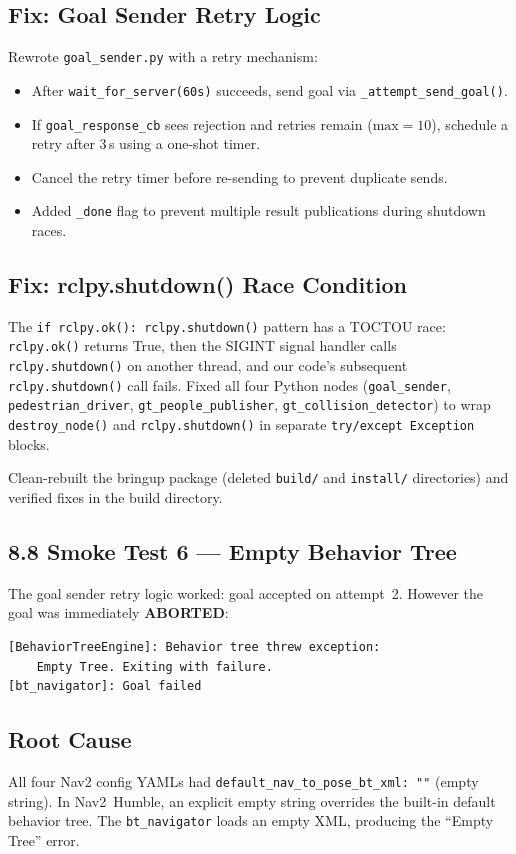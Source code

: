\documentclass[11pt]{article}
\newcommand{\logentry}[1]{\subsection*{#1}}
\begin{document}
\logentry{Fix: Goal Sender Retry Logic}
Rewrote \texttt{goal\_sender.py} with a retry mechanism:
\begin{itemize}
  \item After \texttt{wait\_for\_server(60s)} succeeds, send goal via
    \texttt{\_attempt\_send\_goal()}.
  \item If \texttt{goal\_response\_cb} sees rejection and retries remain
    ($\text{max}=10$), schedule a retry after 3\,s using a one-shot timer.
  \item Cancel the retry timer before re-sending to prevent duplicate sends.
  \item Added \texttt{\_done} flag to prevent multiple result publications
    during shutdown races.
\end{itemize}

\logentry{Fix: rclpy.shutdown() Race Condition}
The \texttt{if rclpy.ok(): rclpy.shutdown()} pattern has a TOCTOU race:
\texttt{rclpy.ok()} returns True, then the SIGINT signal handler calls
\texttt{rclpy.shutdown()} on another thread, and our code's subsequent
\texttt{rclpy.shutdown()} call fails.  Fixed all four Python nodes
(\texttt{goal\_sender}, \texttt{pedestrian\_driver},
\texttt{gt\_people\_publisher}, \texttt{gt\_collision\_detector}) to wrap
\texttt{destroy\_node()} and \texttt{rclpy.shutdown()} in separate
\texttt{try/except Exception} blocks.

Clean-rebuilt the bringup package (deleted \texttt{build/} and
\texttt{install/} directories) and verified fixes in the build directory.


\subsection*{8.8 Smoke Test 6 --- Empty Behavior Tree}

The goal sender retry logic worked: goal accepted on attempt~2.  However the
goal was immediately \textbf{ABORTED}:
\begin{verbatim}
[BehaviorTreeEngine]: Behavior tree threw exception:
    Empty Tree. Exiting with failure.
[bt_navigator]: Goal failed
\end{verbatim}

\logentry{Root Cause}
All four Nav2 config YAMLs had \texttt{default\_nav\_to\_pose\_bt\_xml: ""}
(empty string).  In Nav2~Humble, an explicit empty string overrides the
built-in default behavior tree.  The \texttt{bt\_navigator} loads an empty
XML, producing the ``Empty Tree'' error.
\end{document}
